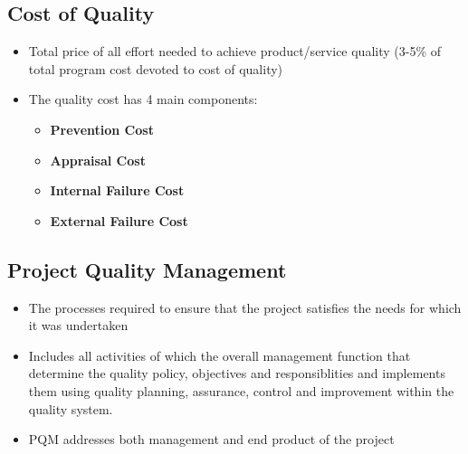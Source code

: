 \documentclass{article}
\begin{document}
\subsection{Cost of Quality}
\begin{itemize}
    \item Total price of all effort needed to achieve product/service quality (3-5\% of total program cost devoted to cost of quality)
    
    \item The quality cost has 4 main components:
    \begin{itemize}
        \item \textbf{Prevention Cost}
        
        \item \textbf{Appraisal Cost}
        
        \item \textbf{Internal Failure Cost}
        
        \item \textbf{External Failure Cost}
    \end{itemize}
\end{itemize}

\subsection{Project Quality Management}
\begin{itemize}
    \item The processes required to ensure that the project satisfies the needs for which it was undertaken
    
    \item Includes all activities of which the overall management function that determine the quality policy, objectives and responsiblities and implements them using quality planning, assurance, control and improvement within the quality system.
    
    \item PQM addresses both management and end product of the project
\end{itemize}
\end{document}
